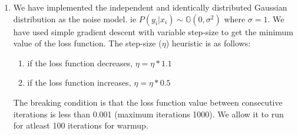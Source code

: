 \documentclass[11pt]{article}
\begin{document}
\maketitle

\begin{enumerate}
    \item 
    We have implemented the independent and identically distributed Gaussian distribution as the noise model. ie $P(y_i | x_i) \sim \mathbb{G}(0, \sigma^2)$ where $\sigma=1$. We have used simple gradient descent with variable step-size to get the minimum value of the loss function. The step-size ($\eta$) heuristic is as follows: 
    \begin{enumerate}
        \item if the loss function decreases, $\eta = \eta*1.1$
        \item if the loss function increases, $\eta = \eta*0.5$
    \end{enumerate}
    The breaking condition is that the loss function value between consecutive iterations is less than 0.001 (maximum iterations 1000). We allow it to run for atleast 100 iterations for warmup. \\
    

\end{enumerate}
\end{document}
